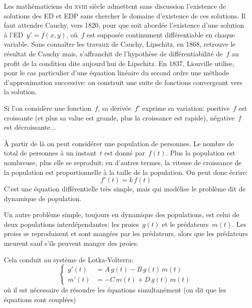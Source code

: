 \medskip
Les mathématiciens du \textsc{xviii} siècle admettent sans discussion l'existence de solutions des 
ED et EDP sans chercher le domaine d'existence de ces solutions.
Il faut attendre Cauchy, 
vers 1820, pour que soit abordée l'existence d'une solution à 
l'ED~$y' = f(x,y)$, où~$f$ est supposée continument différentiable en chaque variable.
Sans connaître les travaux de Cauchy, Lipschitz, 
en 1868, retrouve le résultat de Cauchy mais, s'affranchit de l'hypothèse de différentiabilité 
de~$f$ au profit de la condition dite aujourd'hui de Lipschitz.
En 1837, Liouville 
utilise, pour le cas particulier d'une équation linéaire du second ordre une 
méthode d'approximation successive: on construit une suite de fonctions convergeant
vers la solution.


\medskip
Si l'on considère une fonction~$f$, sa dérivée~$f'$ exprime sa variation: 
positive~$f$ est croissante (et plus sa value est grande, plus la croissance est rapide), 
négative~$f$ est décroissante...

À partir de là on peut considérer une population de personnes. Le nombre de total
de personnes à un instant~$t$ est donné par~$f(t)$.
Plus la population est nombreuse, plus elle se reproduit: en d'autres termes, la
vitesse de croissance de la population est proportionnelle à la taille de la population.
On peut donc écrire: \begin{equation} %
f'(t)=k\,f(t)\end{equation}%
C'est une équation différentielle très simple, mais qui modélise le problème dit de dynamique de population.

\medskip
Un autre problème simple, toujours en dynamique des populations, est celui de deux
populations interdépendantes: les proies~$g(t)$ et le prédateurs~$m(t)$.
Les proies se reproduisent et sont mangées par les prédateurs, alors que
les prédateurs meurent sauf s'ils peuvent manger des proies.

Cela conduit au système de Lotka-Volterra:
\begin{equation}%
  \begin{cases} g'(t)&=A\,g(t)-B\,g(t)\,m(t) \\ m'(t)&=-C\,m(t)+D\,g(t)\,m(t) \end{cases} 
\end{equation}
où il est nécessaire de résoudre les équations simultanément (on dit que les équations
sont couplées)

